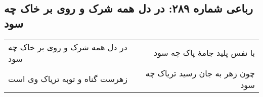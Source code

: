 \begin{center}
\section*{رباعی شماره ۲۸۹: در دل همه شرک و روی بر خاک چه سود}
\label{sec:sh289}
\begin{longtable}{l p{0.5cm} r}
در دل همه شرک و روی بر خاک چه سود
&&
با نفس پلید جامهٔ پاک چه سود
\\
زهرست گناه و توبه تریاک وی است
&&
چون زهر به جان رسید تریاک چه سود
\\
\end{longtable}
\end{center}
